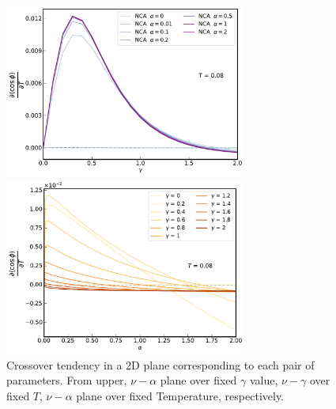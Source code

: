 \documentclass{article}
\begin{document}
\begin{spacing}{1.3}
\begin{figure}[H]
  \centerline{\includegraphics[width=8cm]{TexFigure/4/4_3_11_1.pdf}}
  \centerline{\includegraphics[width=8cm]{TexFigure/4/4_3_11_2.pdf}}
  \caption{Crossover tendency in a 2D plane corresponding to each pair of parameters. From upper, $\nu - \alpha$ plane over fixed $\gamma$ value, $\nu - \gamma$ over fixed $T$, $\nu-\alpha$ plane over fixed Temperature, respectively.}
  \vfill
\end{figure}
\pagebreak
\newpage

\end{spacing}
\end{document}

